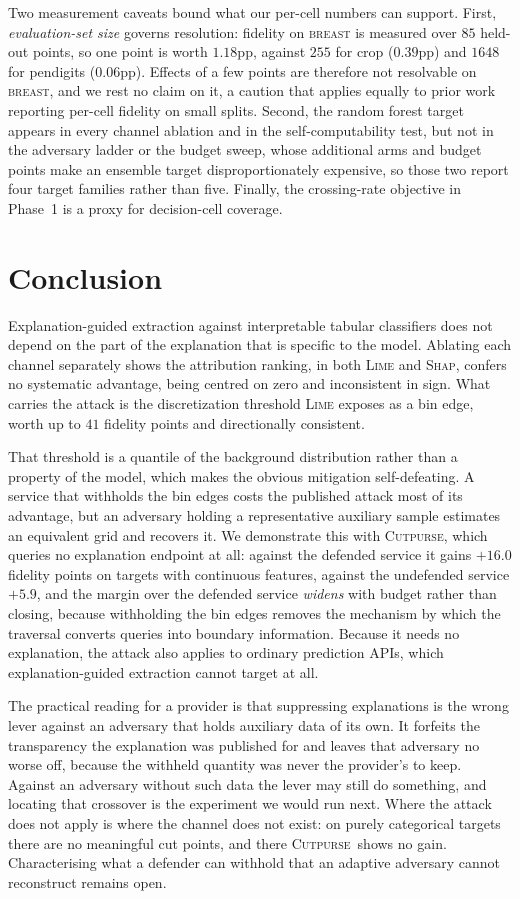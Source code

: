 \documentclass[sigconf,anonymous,review]{acmart}
\newcommand{\sys}{\textsc{Cutpurse}}
\begin{document}
Two measurement caveats bound what our per-cell numbers can support. First, \emph{evaluation-set size}
governs resolution: fidelity on \textsc{breast} is measured over $85$ held-out points, so one point is
worth $1.18$pp, against $255$ for crop ($0.39$pp) and $1648$ for pendigits ($0.06$pp). Effects of a few
points are therefore not resolvable on \textsc{breast}, and we rest no claim on it, a caution that
applies equally to prior work reporting per-cell fidelity on small splits. Second, the random forest
target appears in every channel ablation and in the self-computability test, but not in the adversary
ladder or the budget sweep, whose additional arms and budget points make an ensemble target
disproportionately expensive, so those two report four target families rather than five. Finally, the
crossing-rate objective in Phase~1 is a proxy for decision-cell coverage.

\section{Conclusion}
Explanation-guided extraction against interpretable tabular classifiers does not depend on the part of
the explanation that is specific to the model. Ablating each channel separately shows the attribution
ranking, in both \textsc{Lime} and \textsc{Shap}, confers no systematic advantage, being centred on
zero and inconsistent in sign. What carries the attack is the discretization threshold \textsc{Lime}
exposes as a bin edge, worth up to $41$ fidelity points and directionally consistent.

That threshold is a quantile of the background distribution rather than a property of the model, which
makes the obvious mitigation self-defeating. A service that withholds the bin edges costs the
published attack most of its advantage, but an adversary holding a representative auxiliary sample
estimates an equivalent grid and recovers it. We demonstrate this with \sys, which queries no
explanation endpoint at all: against the defended service it gains $+16.0$ fidelity points on targets
with continuous features, against the undefended service $+5.9$, and the margin over the defended
service \emph{widens} with budget rather than closing, because withholding the bin edges removes the
mechanism by which the traversal converts queries into boundary information. Because it needs no
explanation, the attack also applies to ordinary prediction APIs, which explanation-guided extraction
cannot target at all.

The practical reading for a provider is that suppressing explanations is the wrong lever against an
adversary that holds auxiliary data of its own. It forfeits the transparency the explanation was
published for and leaves that adversary no worse off, because the withheld quantity was never the
provider's to keep. Against an adversary without such data the lever may still do something, and
locating that crossover is the experiment we would run next. Where the attack does not apply is where the
channel does not exist: on purely categorical targets there are no meaningful cut points, and there
\sys\ shows no gain. Characterising what a defender can withhold that an adaptive adversary cannot
reconstruct remains open.
\end{document}
